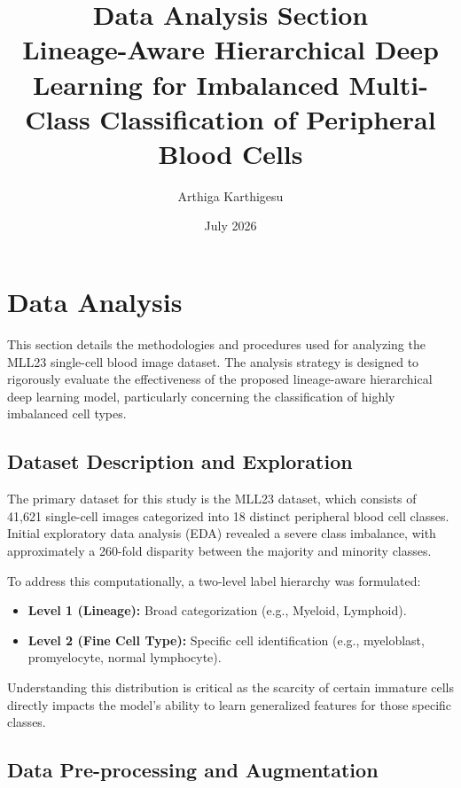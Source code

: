 \documentclass[11pt,a4paper]{article}
\title{Data Analysis Section \\ \large Lineage-Aware Hierarchical Deep Learning for Imbalanced Multi-Class Classification of Peripheral Blood Cells}
\author{Arthiga Karthigesu}
\date{July 2026}
\begin{document}
\maketitle

\section{Data Analysis}

This section details the methodologies and procedures used for analyzing the MLL23 single-cell blood image dataset. The analysis strategy is designed to rigorously evaluate the effectiveness of the proposed lineage-aware hierarchical deep learning model, particularly concerning the classification of highly imbalanced cell types.

\subsection{Dataset Description and Exploration}

The primary dataset for this study is the MLL23 dataset, which consists of 41,621 single-cell images categorized into 18 distinct peripheral blood cell classes. Initial exploratory data analysis (EDA) revealed a severe class imbalance, with approximately a 260-fold disparity between the majority and minority classes. 

To address this computationally, a two-level label hierarchy was formulated:
\begin{itemize}
    \item \textbf{Level 1 (Lineage):} Broad categorization (e.g., Myeloid, Lymphoid).
    \item \textbf{Level 2 (Fine Cell Type):} Specific cell identification (e.g., myeloblast, promyelocyte, normal lymphocyte).
\end{itemize}
Understanding this distribution is critical as the scarcity of certain immature cells directly impacts the model's ability to learn generalized features for those specific classes.

\subsection{Data Pre-processing and Augmentation}
\end{document}
